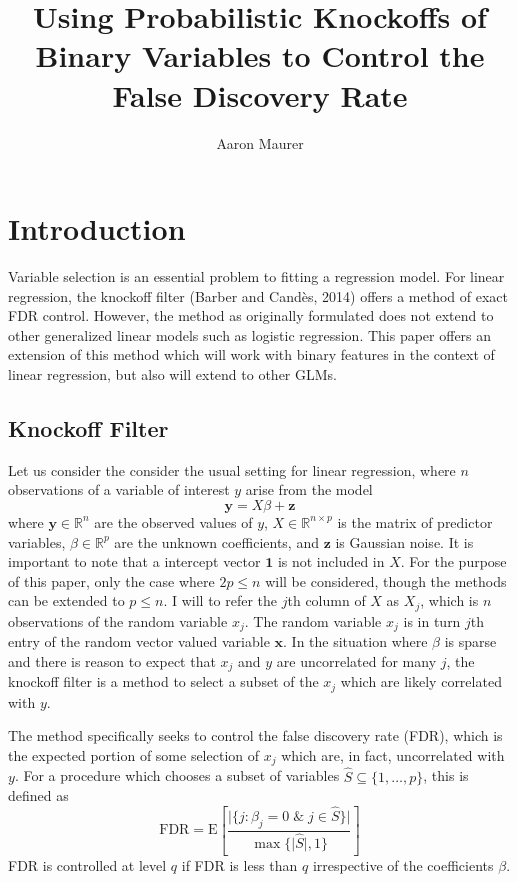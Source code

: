 \documentclass[11pt]{article}
\newcommand{\R}{\mathbb{R}}
\newcommand{\E}{\mathrm{E}}
\theoremstyle{definition}
\begin{document}
\title{Using Probabilistic Knockoffs of Binary Variables to Control the False Discovery Rate}
\author{Aaron Maurer}
\maketitle
\section{Introduction}
    Variable selection is an essential problem to fitting a regression model. For linear regression, the knockoff filter (Barber and Cand\`{e}s, 2014) offers a method of exact FDR control. However, the method as originally formulated does not extend to other generalized linear models such as logistic regression. This paper offers an extension of this method which will work with binary features in the context of linear regression, but also will extend to other GLMs.  
    
\subsection{Knockoff Filter}
    Let us consider the consider the usual setting for linear regression, where $n$ observations of a variable of interest $y$ arise from the model
    \[\mathbf{y} = X\beta + \mathbf{z}\]
    where $\mathbf{y}\in\R^n$ are the observed values of $y$, $X \in \R^{n\times p}$ is the matrix of predictor variables, $\beta\in\R^p$ are the unknown coefficients, and $\mathbf z$ is Gaussian noise. It is important to note that a intercept vector $\mathbf 1$ is not included in $X$. For the purpose of this paper, only the case where $2p\leq n$ will be considered, though the methods can be extended to $p\leq n$. I will to refer the $j$th column of $X$ as $X_j$, which is $n$ observations of the random variable $x_j$. The random variable $x_j$ is in turn $j$th entry of the random vector valued variable $\mathbf x$. In the situation where $\beta$ is sparse and there is reason to expect that $x_j$ and $y$ are uncorrelated for many $j$, the knockoff filter is a method to select a subset of the $x_j$ which are likely correlated with $y$. \par
    The method specifically seeks to control the false discovery rate (FDR), which is the expected portion of some selection of $x_j$ which are, in fact, uncorrelated with $y$. For a procedure which chooses a subset of variables $\hat S\subseteq \{1,\ldots,p\}$, this is defined as  
    \[ \textrm{FDR} = \E\left[\frac{\vert{\{j: \beta_j=0 \; \& \; j\in\hat S\}}\vert}{\max\{\vert{\hat S}\vert,1\}} \right] \]
    FDR is controlled at level $q$ if FDR is less than $q$ irrespective of the coefficients $\beta$. \par
\end{document}
